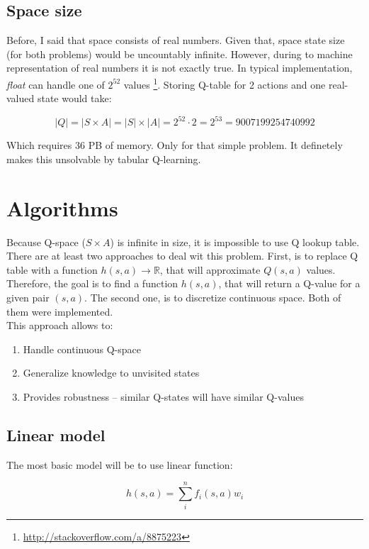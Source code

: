 \documentclass[12pt]{article}
\begin{document}
\subsection{Space size}

Before, I said that space consists of real numbers. Given that, space state size (for both problems) would be uncountably infinite. However, during to machine representation of real numbers it is not exactly true. In typical implementation, \emph{float} can handle one of $2^{52}$ values \footnote{\url{http://stackoverflow.com/a/8875223}}. Storing Q-table for 2 actions and one real-valued state would take:



\begin{equation}
|Q| = |S \times A| = |S| \times |A| = 2^{52} \cdot 2 = 2^{53} = 9007199254740992
\end{equation}

Which requires 36 PB of memory. Only for that simple problem. It definetely makes this unsolvable by tabular Q-learning.

\section{Algorithms}

Because Q-space ($S \times A$) is infinite in size, it is impossible to use Q lookup table. There are at least two approaches to deal wit this problem. First, is to replace Q table with a function $h(s,a) \rightarrow \mathbb{R}$, that will approximate $Q(s, a)$ values. Therefore, the goal is to find a function $h(s, a)$, that will return a Q-value for a given pair $(s,a)$. The second one, is to discretize continuous space. Both of them were implemented.
\\[12pt]
This approach allows to:
\begin{enumerate}
\item Handle continuous Q-space
\item Generalize knowledge to unvisited states
\item Provides robustness – similar Q-states will have similar Q-values
\end{enumerate}

\subsection{Linear model}
The most basic model will be to use linear function:

\begin{equation}
h(s, a) = \sum_i^n f_i(s, a)w_i
\end{equation}
\end{document}
